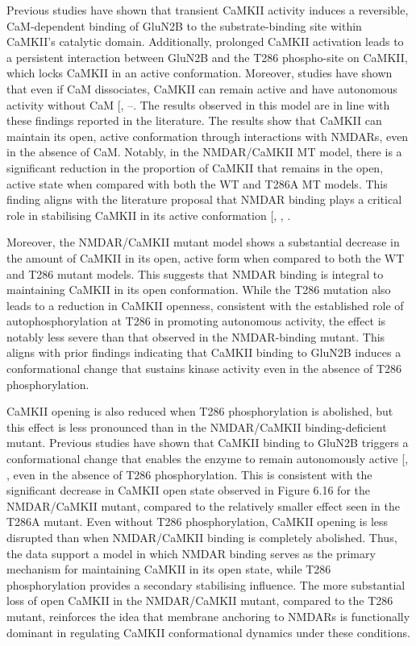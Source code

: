 \documentclass[
  11pt,
  letterpaper,
]{scrreprt}
\begin{document}
Previous studies have shown that transient CaMKII activity induces a
reversible, CaM-dependent binding of GluN2B to the substrate-binding
site within CaMKII's catalytic domain. Additionally, prolonged CaMKII
activation leads to a persistent interaction between GluN2B and the T286
phospho-site on CaMKII, which locks CaMKII in an active conformation.
Moreover, studies have shown that even if CaM dissociates, CaMKII can
remain active and have autonomous activity without CaM
{[},
--\citeproc{ref-buard2010CaMKII}{189}{]}.
The results observed in this model are in line with these findings
reported in the literature. The results show that CaMKII can maintain
its open, active conformation through interactions with NMDARs, even in
the absence of CaM. Notably, in the NMDAR/CaMKII MT model, there is a
significant reduction in the proportion of CaMKII that remains in the
open, active state when compared with both the WT and T286A MT models.
This finding aligns with the literature proposal that NMDAR binding
plays a critical role in stabilising CaMKII in its active conformation
{[},
,
\citeproc{ref-bayer2006Transitionb}{214}{]}.

Moreover, the NMDAR/CaMKII mutant model shows a substantial decrease in
the amount of CaMKII in its open, active form when compared to both the
WT and T286 mutant models. This suggests that NMDAR binding is integral
to maintaining CaMKII in its open conformation. While the T286 mutation
also leads to a reduction in CaMKII openness, consistent with the
established role of autophosphorylation at T286 in promoting autonomous
activity, the effect is notably less severe than that observed in the
NMDAR-binding mutant. This aligns with prior findings indicating that
CaMKII binding to GluN2B induces a conformational change that sustains
kinase activity even in the absence of T286 phosphorylation.

CaMKII opening is also reduced when T286 phosphorylation is abolished,
but this effect is less pronounced than in the NMDAR/CaMKII
binding-deficient mutant. Previous studies have shown that CaMKII
binding to GluN2B triggers a conformational change that enables the
enzyme to remain autonomously active
{[},
\citeproc{ref-barcomb2016CaMKIIa}{452}{]}, even in the absence of T286
phosphorylation. This is consistent with the significant decrease in
CaMKII open state observed in Figure 6.16 for the NMDAR/CaMKII mutant,
compared to the relatively smaller effect seen in the T286A mutant. Even
without T286 phosphorylation, CaMKII opening is less disrupted than when
NMDAR/CaMKII binding is completely abolished. Thus, the data support a
model in which NMDAR binding serves as the primary mechanism for
maintaining CaMKII in its open state, while T286 phosphorylation
provides a secondary stabilising influence. The more substantial loss of
open CaMKII in the NMDAR/CaMKII mutant, compared to the T286 mutant,
reinforces the idea that membrane anchoring to NMDARs is functionally
dominant in regulating CaMKII conformational dynamics under these
conditions.
\end{document}
